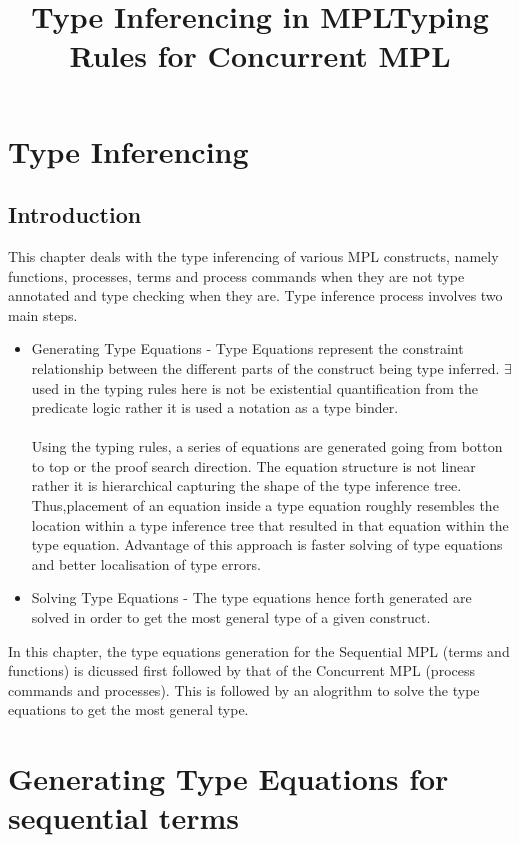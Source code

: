 \documentclass[11pt]{article}
\title{Type Inferencing in MPL}
\title{Typing Rules for Concurrent MPL}
\begin{document}
\maketitle

\section{Type Inferencing}

\subsection {Introduction}
This chapter deals with the type inferencing of various MPL constructs, namely functions, processes, terms and process commands when they are not type annotated and type checking when they are. Type inference process involves two main steps.
\begin {itemize}
\item Generating Type Equations - Type Equations represent the constraint relationship between the different parts of the construct being type inferred. $\exists$ used in the typing rules here is not be existential quantification from the predicate logic rather it is used a notation as a type binder.
~~\\~~\\
Using the typing rules, a series of equations are generated going from botton to top or the  proof search direction. The equation structure is not linear rather it is hierarchical capturing the shape of the type inference tree. Thus,placement of an equation inside a type equation roughly resembles the location within a type inference tree that resulted in that equation within the type equation. Advantage of this approach is faster solving of type equations and better localisation of type errors.     
\item Solving Type Equations - The type equations hence forth generated are solved in order to get the most general type of a given construct.
\end{itemize}
In this chapter, the type equations generation for the Sequential MPL (terms and functions) is dicussed first followed by that of the Concurrent MPL (process commands and processes). This is followed by an alogrithm to solve the type equations to get the most general type.

\section {Generating Type Equations for sequential terms }
\end{document}
